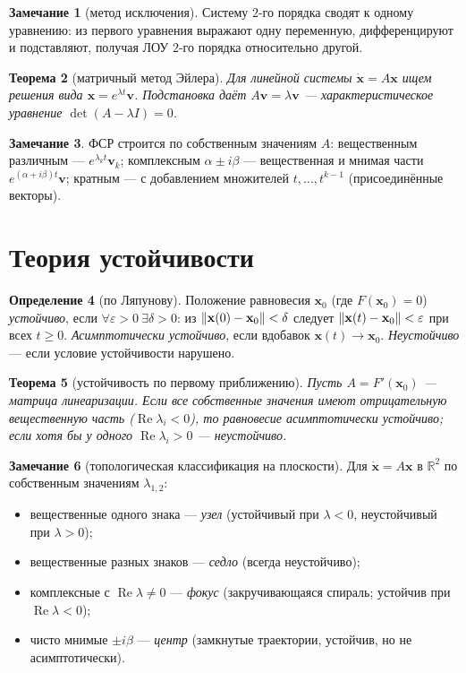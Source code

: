 \documentclass[11pt,a4paper]{article}
\theoremstyle{definition}
\newtheorem{definition}{Определение}[section]
\newtheorem{remark}[definition]{Замечание}
\theoremstyle{plain}
\newtheorem{theorem}[definition]{Теорема}
\newcommand{\R}{\mathbb{R}}
\newcommand{\eps}{\varepsilon}
\renewcommand{\Re}{\operatorname{Re}}
\renewcommand{\ge}{\geqslant}
\DeclarePairedDelimiter{\norm}{\lVert}{\rVert}
\begin{document}
\begin{remark}[метод исключения]
Систему $2$-го порядка сводят к одному уравнению: из первого уравнения выражают одну переменную,
дифференцируют и подставляют, получая ЛОУ $2$-го порядка относительно другой.
\end{remark}

\begin{theorem}[матричный метод Эйлера]
Для линейной системы $\dot{\mathbf x}=A\mathbf x$ ищем решения вида $\mathbf x=e^{\lambda t}\mathbf v$.
Подстановка даёт $A\mathbf v=\lambda\mathbf v$ — характеристическое уравнение $\det(A-\lambda I)=0$.
\end{theorem}

\begin{remark}
ФСР строится по собственным значениям $A$: вещественным различным — $e^{\lambda_k t}\mathbf v_k$;
комплексным $\alpha\pm i\beta$ — вещественная и мнимая части $e^{(\alpha+i\beta)t}\mathbf v$;
кратным — с добавлением множителей $t,\dots,t^{k-1}$ (присоединённые векторы).
\end{remark}

\section{Теория устойчивости}

\begin{definition}[по Ляпунову]
Положение равновесия $\mathbf x_0$ (где $F(\mathbf x_0)=0$) \emph{устойчиво}, если
$\forall\eps>0\ \exists\delta>0$: из $\norm{\mathbf x(0)-\mathbf x_0}<\delta$ следует
$\norm{\mathbf x(t)-\mathbf x_0}<\eps$ при всех $t\ge0$. \emph{Асимптотически устойчиво}, если вдобавок
$\mathbf x(t)\to\mathbf x_0$. \emph{Неустойчиво} — если условие устойчивости нарушено.
\end{definition}

\begin{theorem}[устойчивость по первому приближению]
Пусть $A=F'(\mathbf x_0)$ — матрица линеаризации. Если все собственные значения имеют отрицательную
вещественную часть ($\Re\lambda_i<0$), то равновесие асимптотически устойчиво; если хотя бы у одного
$\Re\lambda_i>0$ — неустойчиво.
\end{theorem}

\begin{remark}[топологическая классификация на плоскости]
Для $\dot{\mathbf x}=A\mathbf x$ в $\R^2$ по собственным значениям $\lambda_{1,2}$:
\begin{itemize}[leftmargin=*,nosep]
  \item вещественные одного знака — \emph{узел} (устойчивый при $\lambda<0$, неустойчивый при $\lambda>0$);
  \item вещественные разных знаков — \emph{седло} (всегда неустойчиво);
  \item комплексные с $\Re\lambda\ne0$ — \emph{фокус} (закручивающаяся спираль; устойчив при $\Re\lambda<0$);
  \item чисто мнимые $\pm i\beta$ — \emph{центр} (замкнутые траектории, устойчив, но не асимптотически).
\end{itemize}
\end{remark}
\end{document}
